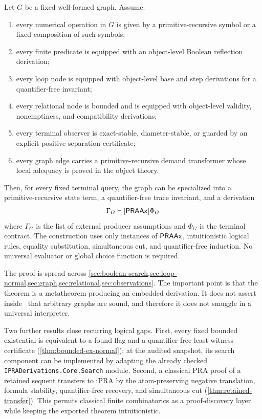 \begin{theorem}\label{thm:main-compilation}
Let \(G\) be a fixed well-formed \KIFC graph.  Assume:
\begin{enumerate}[label=(\alph*)]
  \item every numerical operation in \(G\) is given by a primitive-recursive symbol or a fixed composition of such symbols;
  \item every finite predicate is equipped with an object-level Boolean reflection derivation;
  \item every loop node is equipped with object-level base and step derivations for a quantifier-free invariant;
  \item every relational node is bounded and is equipped with object-level validity, nonemptiness, and compatibility derivations;
  \item every terminal observer is exact-stable, diameter-stable, or guarded by an explicit positive separation certificate;
  \item every graph edge carries a primitive-recursive demand transformer whose local adequacy is proved in the object theory.
\end{enumerate}
Then, for every fixed terminal query, the graph can be specialized into a primitive-recursive state term, a quantifier-free trace invariant, and a derivation
\[
  \Gamma_G \vdash[\mathsf{PRAAx}] \Phi_G
\]
where \(\Gamma_G\) is the list of external producer assumptions and \(\Phi_G\) is the terminal contract.  The construction uses only instances of \(\mathsf{PRAAx}\), intuitionistic logical rules, equality substitution, simultaneous cut, and quantifier-free induction.  No universal evaluator or global choice function is required.
\end{theorem}

The proof is spread across \cref{sec:boolean-search,sec:loop-normal,sec:graph,sec:relational,sec:observations}.  The important point is that the theorem is a metatheorem producing an embedded derivation.  It does not assert inside \iPRA\ that arbitrary graphs are sound, and therefore it does not smuggle in a universal interpreter.

Two further results close recurring logical gaps.  First, every fixed bounded existential is equivalent to a found flag and a quantifier-free least-witness certificate (\cref{thm:bounded-ex-normal}); at the audited snapshot, its search component can be implemented by adapting the already checked \texttt{IPRADerivations.Core.Search} module.  Second, a classical PRA proof of a retained sequent transfers to iPRA by the atom-preserving negative translation, formula stability, quantifier-free recovery, and simultaneous cut (\cref{thm:retained-transfer}).  This permits classical finite combinatorics as a proof-discovery layer while keeping the exported theorem intuitionistic.

